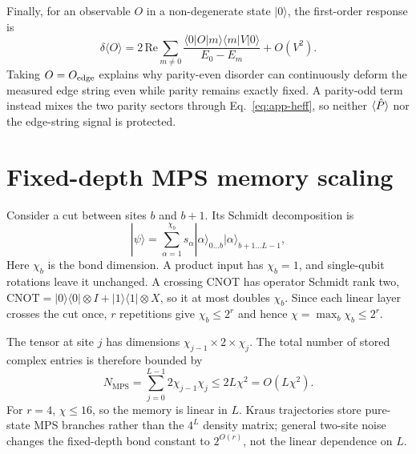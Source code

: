 Finally, for an observable $O$ in a non-degenerate state $|0\rangle$, the
first-order response is
\begin{equation}
 \delta\langle O\rangle=
 2\,\mathrm{Re}\sum_{m\ne0}
 \frac{\langle0|O|m\rangle\langle m|V|0\rangle}{E_0-E_m}+O(V^2).
 \label{eq:app-observable-response}
\end{equation}
Taking $O=O_{\mathrm{edge}}$ explains why parity-even disorder can continuously deform
the measured edge string even while parity remains exactly fixed. A
parity-odd term instead mixes the two parity sectors through
Eq.~\eqref{eq:app-heff}, so neither $\langle\hat{P}\rangle$ nor the edge-string
signal is protected.

\section{Fixed-depth MPS memory scaling}
\label{app:mps-memory}

Consider a cut between sites $b$ and $b+1$. Its Schmidt decomposition is
\begin{equation}
 |\psi\rangle=\sum_{\alpha=1}^{\chi_b}s_\alpha
 |\alpha\rangle_{0\ldots b}|\alpha\rangle_{b+1\ldots L-1},
 \label{eq:app-schmidt}
\end{equation}
Here $\chi_b$ is the bond dimension. A product input has $\chi_b=1$, and
single-qubit rotations leave it unchanged. A crossing CNOT has operator
Schmidt rank two,
$\mathrm{CNOT}=|0\rangle\!\langle0|\otimes I
+|1\rangle\!\langle1|\otimes X$, so it at most doubles $\chi_b$.
Since each linear layer crosses the cut once, $r$ repetitions give
$\chi_b\leq2^r$ and hence $\chi=\max_b\chi_b\leq2^r$.

The tensor at site $j$ has dimensions
$\chi_{j-1}\times2\times\chi_j$. The total number of stored complex entries is
therefore bounded by
\begin{equation}
 N_{\mathrm{MPS}}=\sum_{j=0}^{L-1}2\chi_{j-1}\chi_j
 \leq2L\chi^2=O(L\chi^2).
 \label{eq:app-mps-memory}
\end{equation}
For $r=4$, $\chi\leq16$, so the memory is linear in $L$. Kraus trajectories
store pure-state MPS branches rather than the $4^L$ density matrix; general
two-site noise changes the fixed-depth bond constant to $2^{O(r)}$, not the
linear dependence on $L$.
